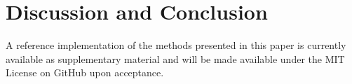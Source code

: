 \documentclass{article}
\begin{document}
%





\section{Discussion and Conclusion}
\label{sec:conclusion}







A reference implementation of the methods presented in this paper is currently available as supplementary material and will be made available under the MIT License on GitHub upon acceptance.






%
\begingroup
\small


\endgroup
\end{document}

